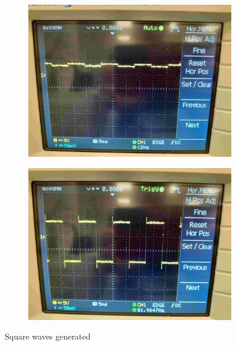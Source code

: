 \documentclass[pdftex,12pt,a4paper]{article}
\begin{document}
\begin{itemize}
\begin{figure}[H]
\begin{subfigure}{0.5\textwidth}
\centering
\includegraphics[width=.95\linewidth]{square_wave_1.jpg}
\end{subfigure}%
\begin{subfigure}{0.5\textwidth}
\centering
\includegraphics[width=.95\linewidth]{square_wave_2.jpg}
\end{subfigure}
\caption{Square waves generated}
\end{figure}   


\end{itemize}
\end{document}
